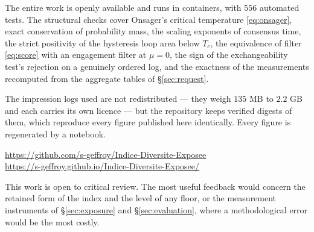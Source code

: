\documentclass[11pt,a4paper]{article}
\begin{document}
The entire work is openly available and runs in containers, with $556$ automated tests. The
structural checks cover Onsager's critical temperature \eqref{eq:onsager}, exact conservation of
probability mass, the scaling exponents of consensus time, the strict positivity of the
hysteresis loop area below $T_c$, the equivalence of filter \eqref{eq:score} with an engagement
filter at $\mu = 0$, the sign of the exchangeability test's rejection on a genuinely ordered
log, and the exactness of the measurements recomputed from the aggregate tables of
\S\ref{sec:request}.

The impression logs used are not redistributed --- they weigh $135$ MB to $2.2$ GB and each
carries its own licence --- but the repository keeps verified digests of them, which reproduce
every figure published here identically. Every figure is regenerated by a notebook.

\begin{center}
\url{https://github.com/s-geffroy/Indice-Diversite-Exposee}\\
\url{https://s-geffroy.github.io/Indice-Diversite-Exposee/}
\end{center}

This work is open to critical review. The most useful feedback would concern the retained form
of the index and the level of any floor, or the measurement instruments of \S\ref{sec:exposure}
and \S\ref{sec:evaluation}, where a methodological error would be the most costly.


\end{document}
